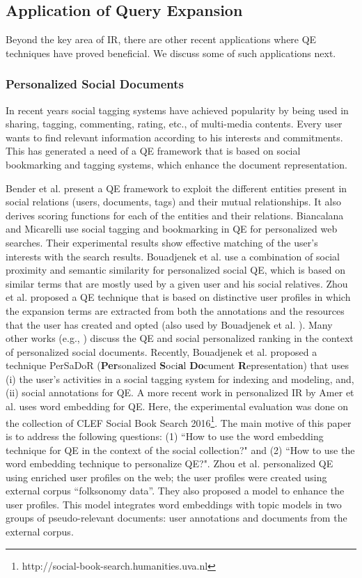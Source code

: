 \subsection{Application of Query Expansion}
Beyond the key area of IR,  there are other recent applications where QE techniques have proved beneficial. We discuss some of such applications next.

\subsubsection{Personalized Social Documents}
In recent years social tagging systems have achieved popularity by being used in sharing, tagging, commenting, rating, etc., of multi-media contents. Every user wants to find relevant information according to his interests and commitments. This has generated a need of a QE framework that is based on social bookmarking and tagging systems, which enhance the document representation. 

Bender et al. \cite{bender2008exploiting} present a QE framework to exploit the different entities present in social relations (users, documents, tags) and their mutual relationships. It also derives scoring functions for each of the entities and their relations. Biancalana and Micarelli \cite{biancalana2009social} use social tagging and bookmarking in QE for personalized web searches. Their experimental results show effective matching of the user's interests with the search results. Bouadjenek et al. \cite{bouadjenek2011personalized} use a combination of social proximity and semantic similarity for personalized social QE, which is based on similar terms that are mostly used by a given user and his social relatives. Zhou et al. \cite{zhou2012improving} proposed a QE technique that is based on distinctive user profiles in which the expansion terms are extracted from both the annotations and the resources that the user has created and opted (also used by Bouadjenek et al. \cite{bouadjenek2013laicos}). Many other works (e.g., \cite{bouadjenek2013sopra,hahm2014personalized,Mulhem2016}) discuss the QE and social personalized ranking in the context of personalized social documents. Recently, Bouadjenek et al. \cite{bouadjenek2016persador} proposed a technique PerSaDoR (\textbf{Per}sonalized \textbf{S}oci\textbf{a}l \textbf{Do}cument \textbf{R}epresentation) that uses (i) the user's activities in a social tagging system for indexing and modeling, and, (ii) social annotations for QE. A more recent work in personalized IR by Amer et al. \cite{amer2016toward} uses  word embedding for QE. Here, the experimental evaluation was done on the collection of CLEF Social Book Search 2016\footnote{http://social-book-search.humanities.uva.nl}. The main motive of this paper is to address the following questions: (1) ``How to use the word embedding technique for QE in the context of the social collection?" and (2) ``How to use the word embedding technique to personalize QE?". Zhou et al. \cite{zhou2017query} personalized QE using enriched user profiles on the web; the user profiles were created using external corpus ``folksonomy data''. They also proposed a model to enhance the user profiles. This model integrates word embeddings with topic models in two groups of pseudo-relevant documents: user annotations and documents from the external corpus.
